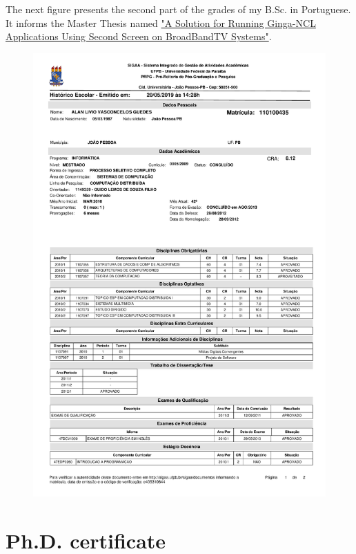 \documentclass[10pt,a4paper,sans,colorlinks]{moderncv}
\begin{document}
\newpage
The next figure presents the second part of the grades of my B.Sc. in Portuguese.
It informs the Master Thesis named \href{https://repositorio.ufpb.br/jspui/handle/tede/6087}{"A Solution for Running Ginga-NCL Applications Using Second Screen on BroadBandTV Systems"}.
\vspace{1em}
\begin{figure}
    \centering
    \includegraphics[align=t,width=\textwidth,height=0.6\paperheight, keepaspectratio=true, page=2, trim=0cm 0cm 0cm 2cm]{certificates/msc-grades.pdf}
\end{figure}


\newpage
\section{Ph.D. certificate}
\end{document}
